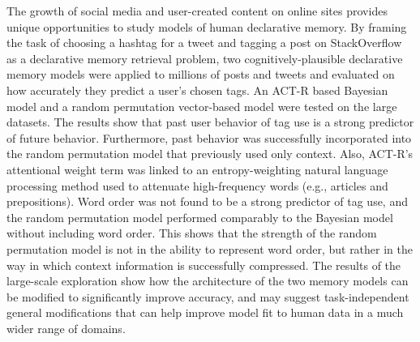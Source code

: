 \documentclass[answers,12pt]{exam}
\begin{document}
\begin{questions}

\question 

 The growth of social media and user-created content on online sites provides unique opportunities to study models of human declarative memory.
  By framing the task of choosing a hashtag for a tweet and tagging a post on StackOverflow as a declarative memory retrieval problem,
  two cognitively-plausible declarative memory models were applied to millions of posts and tweets and evaluated on how accurately they predict a user's chosen tags.
  An ACT-R based Bayesian model and a random permutation vector-based model were tested on the large datasets.
  The results show that past user behavior of tag use is a strong predictor of future behavior.
  Furthermore, past behavior was successfully incorporated into the random permutation model that previously used only context.
  Also, ACT-R's attentional weight term was linked to an entropy-weighting natural language processing method used to attenuate high-frequency words (e.g., articles and prepositions).
  Word order was not found to be a strong predictor of tag use, and the random permutation model performed comparably to the Bayesian model without including word order.
  This shows that the strength of the random permutation model is not in the ability to represent word order, but rather in the way in which context information is successfully compressed.
  The results of the large-scale exploration show how the architecture of the two memory models can be modified to significantly improve accuracy,
  and may suggest task-independent general modifications that can help improve model fit to human data in a much wider range of domains.


\begin{solution}


\end{solution}
\end{questions}
\end{document}

